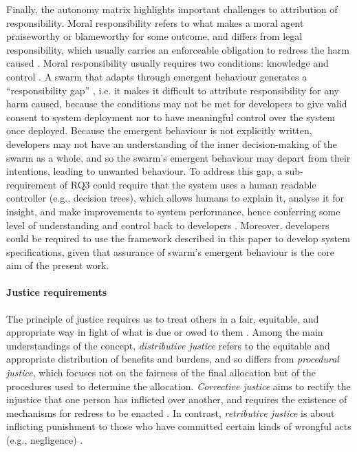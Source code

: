 \documentclass[lettersize,journal]{IEEEtran}
\begin{document}
Finally, the autonomy matrix highlights important challenges to attribution of responsibility. Moral responsibility refers to what makes a moral agent praiseworthy or blameworthy for some outcome, and differs from legal responsibility, which usually carries an enforceable obligation to redress the harm caused \cite{burton2020mind}. Moral responsibility usually requires two conditions: knowledge and control \cite{santoni2021four}. A swarm that adapts through emergent behaviour generates a ``responsibility gap” \cite{matthias2004responsibility}, i.e. it makes it difficult to attribute responsibility for any harm caused, because the conditions may not be met for developers to give valid consent to system deployment nor to have meaningful control over the system once deployed. Because the emergent behaviour is not explicitly written, developers may not have an understanding of the inner decision-making of the swarm as a whole, and so the swarm’s emergent behaviour may depart from their intentions, leading to unwanted behaviour. To address this gap, a sub-requirement of RQ3 could require that the system uses a human readable controller (e.g., decision trees), which allows humans to explain it, analyse it for insight, and make improvements to system performance, hence conferring some level of understanding and control back to developers \cite{jones2019onboard}. Moreover, developers could be required to use the framework described in this paper to develop system specifications, given that assurance of swarm’s emergent behaviour is the core aim of the present work. 
\\
\paragraph*{Justice requirements}
The principle of justice requires us to treat others in a fair, equitable, and appropriate way in light of what is due or owed to them \cite{beauchamp2019principles}. Among the main understandings of the concept, \textit{distributive justice} refers to the equitable and appropriate distribution of benefits and burdens, and so differs from \textit{procedural justice}, which focuses not on the fairness of the final allocation but of the procedures used to determine the allocation. \textit{Corrective justice} aims to rectify the injustice that one person has inflicted over another, and requires the existence of mechanisms for redress to be enacted \cite{sep-justice}. In contrast, \textit{retributive justice} is about inflicting punishment to those who have committed certain kinds of wrongful acts (e.g., negligence) \cite{sep-justice-retributive}. 
\end{document}
